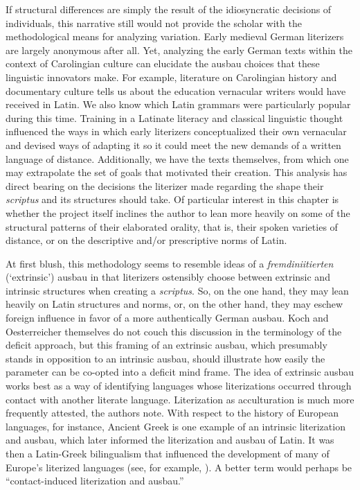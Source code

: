 If structural differences are simply the result of the idiosyncratic decisions of individuals, this narrative still would not provide the scholar with the methodological means for analyzing variation. Early medieval German literizers are largely anonymous after all. Yet, analyzing the early German texts within the context of Carolingian culture can elucidate the ausbau choices that these linguistic innovators make. For example, literature on Carolingian history and documentary culture tells us about the education vernacular writers would have received in Latin. We also know which Latin grammars were particularly popular during this time. Training in a Latinate literacy and classical linguistic thought influenced the ways in which early literizers conceptualized their own vernacular and devised ways of adapting it so it could meet the new demands of a written language of distance. Additionally, we have the texts themselves, from which one may extrapolate the set of goals that motivated their creation. This analysis has direct bearing on the decisions the literizer made regarding the shape their \textit{scriptus} and its structures should take. Of particular interest in this chapter is whether the project itself inclines the author to lean more heavily on some of the structural patterns of their elaborated orality, that is, their spoken varieties of distance, or on the descriptive and/or prescriptive norms of Latin.

At first blush, this methodology seems to resemble  ideas of a \textit{fremdiniitierten} (‘extrinsic’) ausbau in that literizers ostensibly choose between extrinsic and intrinsic structures when creating a \textit{scriptus}. So, on the one hand, they may lean heavily on Latin structures and norms, or, on the other hand, they may eschew foreign influence in favor of a more authentically German ausbau. Koch and Oesterreicher themselves do not couch this discussion in the terminology of the deficit approach, but this framing of an extrinsic ausbau, which presumably stands in opposition to an intrinsic ausbau, should illustrate how easily the parameter can be co-opted into a deficit mind frame. The idea of extrinsic ausbau works best as a way of identifying languages whose literizations occurred through contact with another literate language. Literization as acculturation is much more frequently attested, the authors note. With respect to the history of European languages, for instance, Ancient Greek is one example of an intrinsic literization and ausbau, which later informed the literization and ausbau of Latin. It was then a Latin-Greek bilingualism that influenced the development of many of Europe’s literized languages (see, for example, \citealt[77]{Höder2010}). A better term would perhaps be “contact\hyp induced literization and ausbau.”

